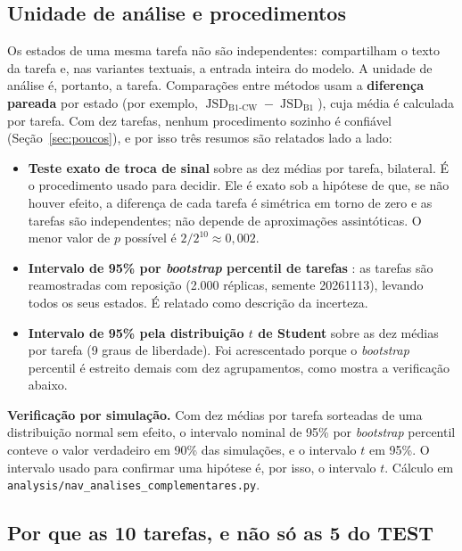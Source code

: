 \documentclass[12pt,oneside,a4paper,chapter=TITLE,english,brazil]{abntex2}
\newcommand{\code}[1]{\texttt{#1}}
\DeclareMathOperator{\JSD}{JSD}
\begin{document}
\subsection{Unidade de análise e procedimentos}

Os estados de uma mesma tarefa não são independentes: compartilham o texto da tarefa e, nas variantes textuais, a entrada inteira do modelo. A unidade de análise é, portanto, a tarefa. Comparações entre métodos usam a \textbf{diferença pareada} por estado (por exemplo, $\JSD_{\text{B1-CW}} - \JSD_{\text{B1}}$), cuja média é calculada por tarefa. Com dez tarefas, nenhum procedimento sozinho é confiável (Seção~\ref{sec:poucos}), e por isso três resumos são relatados lado a lado:

\begin{itemize}
\item \textbf{Teste exato de troca de sinal} sobre as dez médias por tarefa, bilateral. É o procedimento usado para decidir. Ele é exato sob a hipótese de que, se não houver efeito, a diferença de cada tarefa é simétrica em torno de zero e as tarefas são independentes; não depende de aproximações assintóticas. O menor valor de $p$ possível é $2/2^{10}\approx0{,}002$.
\item \textbf{Intervalo de 95\% por \textit{bootstrap} percentil de tarefas} \cite{efron1993bootstrap}: as tarefas são reamostradas com reposição (2.000 réplicas, semente 20261113), levando todos os seus estados. É relatado como descrição da incerteza.
\item \textbf{Intervalo de 95\% pela distribuição $t$ de Student} sobre as dez médias por tarefa (9 graus de liberdade). Foi acrescentado porque o \textit{bootstrap} percentil é estreito demais com dez agrupamentos, como mostra a verificação abaixo.
\end{itemize}

\begin{real}
\textbf{Verificação por simulação.} Com dez médias por tarefa sorteadas de uma distribuição normal sem efeito, o intervalo nominal de 95\% por \textit{bootstrap} percentil conteve o valor verdadeiro em 90\% das simulações, e o intervalo $t$ em 95\%. O intervalo usado para confirmar uma hipótese é, por isso, o intervalo $t$. Cálculo em \code{analysis/nav\_analises\_complementares.py}.
\end{real}

\subsection{Por que as 10 tarefas, e não só as 5 do TEST}
\end{document}
